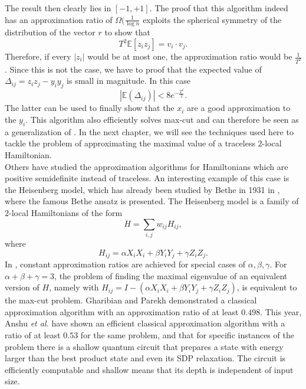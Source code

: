 The result then clearly lies in $\left[ -1,+1\right]$.
The proof that this algorithm indeed has an approximation ratio of $\Omega(\frac{1}{\log{}n}$ exploits the spherical symmetry of the distribution of the vector $r$ to show that \[
T^2\mathbb{E}\left[ z_iz_j \right] = v_i\cdot v_j
.\]
Therefore, if every $\left| z_i \right| $ would be at most one, the approximation ratio would be $\frac{1}{T^2}$.
Since this is not the case, we have to proof that the expected value of $\Delta_{ij}=z_iz_j - y_iy_j$ is small in magnitude.
In this case \[
	\left|\mathbb{E}(\Delta_{ij})\right|<8e^{-\frac{T^2}{2}}
.\]
The latter can be used to finally show that the $x_i$ are a good approximation to the $y_i$.
This algorithm also efficiently solves max-cut and can therefore be seen as a generalization of \cite{goemans95}.
In the next chapter, we will see the techniques used here to tackle the problem of approximating the maximal value of a traceless $2$-local Hamiltonian.\\
Others have studied the approximation algorithms for Hamiltonians which are positive semidefinite instead of traceless.\cite{gharibian19,anshu20,brandao14}
An interesting example of this case is the Heisenberg model, which has already been studied by Bethe in 1931 in \cite{bethe31}, where the famous Bethe ansatz is presented.
The Heisenberg model is a family of $2$-local Hamiltonians of the form \[
H=\sum_{i,j} w_{ij}H_{ij}
,\] where \[
H_{ij}=\alpha X_iX_i + \beta Y_iY_j + \gamma Z_iZ_j
.\]
In \cite{gharibian19}, constant approximation ratios are achieved for special cases of $\alpha, \beta, \gamma$.
For $\alpha+\beta+\gamma=3$, the problem of finding the maximal eigenvalue of an equivalent version of $H$, namely with  $H_{ij}=I-(\alpha X_iX_i + \beta Y_iY_j + \gamma Z_iZ_j)$, is equivalent to the max-cut problem.
Gharibian and Parekh demonstrated a classical approximation algorithm with an approximation ratio of at least $0.498$.
This year, Anshu \emph{et al.}\cite{anshu20} have shown an efficient classical approximation algorithm with a ratio of at least $0.53$ for the same problem, and that for specific instances of the problem there is a shallow quantum circuit that prepares a state with energy larger than the best product state and even its SDP relaxation.
The circuit is efficiently computable and shallow means that its depth is independent of input size.
